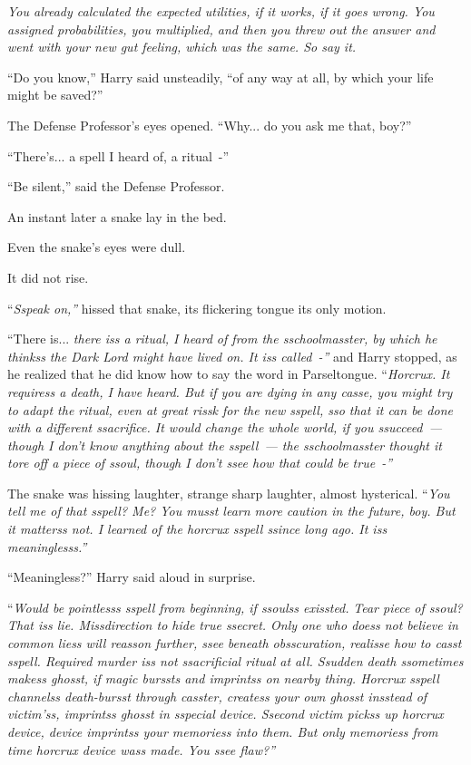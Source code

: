 \emph{You already calculated the expected utilities, if it works, if it goes wrong. You assigned probabilities, you multiplied, and then you threw out the answer and went with your new gut feeling, which was the same. So say it.}

``Do you know,'' Harry said unsteadily, ``of any way at all, by which your life might be saved?''

The Defense Professor's eyes opened. ``Why... do you ask me that, boy?''

``There's... a spell I heard of, a ritual~-''

``Be silent,'' said the Defense Professor.

An instant later a snake lay in the bed.

Even the snake's eyes were dull.

It did not rise.

``\emph{Sspeak on,''} hissed that snake, its flickering tongue its only motion.

``There is... \emph{there iss a ritual, I heard of from the sschoolmasster, by which he thinkss the Dark Lord might have lived on. It iss called~-''} and Harry stopped, as he realized that he did know how to say the word in Parseltongue. ``\emph{Horcrux. It requiress a death, I have heard. But if you are dying in any casse, you might try to adapt the ritual, even at great rissk for the new sspell, sso that it can be done with a different ssacrifice. It would change the whole world, if you ssucceed~--- though I don't know anything about the sspell~--- the sschoolmasster thought it tore off a piece of ssoul, though I don't ssee how that could be true~-''}

The snake was hissing laughter, strange sharp laughter, almost hysterical. ``\emph{You tell me of that sspell? Me? You musst learn more caution in the future, boy. But it matterss not. I learned of the horcrux sspell ssince long ago. It iss meaninglesss.''}

``Meaningless?'' Harry said aloud in surprise.

``\emph{Would be pointlesss sspell from beginning, if ssoulss exissted.} \emph{Tear piece of ssoul? That iss lie. Missdirection to hide true ssecret. Only one who doess not believe in common liess will reasson further, ssee beneath obsscuration, realisse how to casst sspell. Required murder iss not ssacrificial ritual at all. Ssudden death ssometimes makess ghosst, if magic burssts and imprintss on nearby thing. Horcrux sspell channelss death-bursst through casster, createss your own ghosst insstead of victim'ss, imprintss ghosst in sspecial device. Ssecond victim pickss up horcrux device, device imprintss your memoriess into them. But only memoriess from time horcrux device wass made. You ssee flaw?''}

